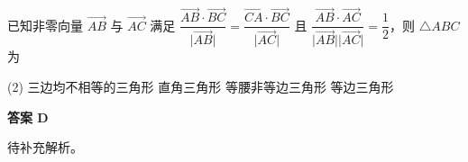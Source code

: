 \begin{choice}[source={必修二P52页习题}, topic={向量的投影与三角形形状}]
已知非零向量 $\overrightarrow{AB}$ 与 $\overrightarrow{AC}$ 满足 $\dfrac{\overrightarrow{AB} \cdot \overrightarrow{BC}}{\lvert\overrightarrow{AB}\rvert} = \dfrac{\overrightarrow{CA} \cdot \overrightarrow{BC}}{\lvert\overrightarrow{AC}\rvert}$ 且 $\dfrac{\overrightarrow{AB} \cdot \overrightarrow{AC}}{\lvert\overrightarrow{AB}\rvert\lvert\overrightarrow{AC}\rvert} = \dfrac{1}{2}$，则 $\triangle ABC$ 为
\begin{tasks}(2)
	\task 三边均不相等的三角形
	\task 直角三角形
	\task 等腰非等边三角形
	\task 等边三角形
\end{tasks}
\end{choice}
\begin{choice-sol}
\textbf{答案 D}

待补充解析。
\end{choice-sol}
